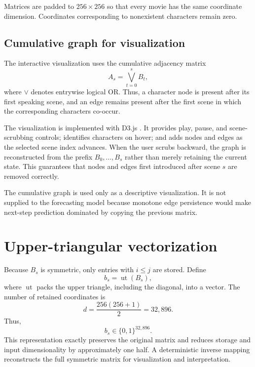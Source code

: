 \documentclass[11pt]{article}
\begin{document}
Matrices are padded to $256\times256$ so that every movie has the same coordinate dimension. Coordinates corresponding to nonexistent characters remain zero.

\subsection{Cumulative graph for visualization}

The interactive visualization uses the cumulative adjacency matrix
\begin{equation}
  A_s=\bigvee_{t=0}^{s} B_t,
  \label{eq:cumulative-adjacency}
\end{equation}
where $\vee$ denotes entrywise logical OR. Thus, a character node is present after its first speaking scene, and an edge remains present after the first scene in which the corresponding characters co-occur.

The visualization is implemented with D3.js \cite{bostock2011d3}. It provides play, pause, and scene-scrubbing controls; identifies characters on hover; and adds nodes and edges as the selected scene index advances. When the user scrubs backward, the graph is reconstructed from the prefix $B_0,\ldots,B_s$ rather than merely retaining the current state. This guarantees that nodes and edges first introduced after scene $s$ are removed correctly.

The cumulative graph is used only as a descriptive visualization. It is not supplied to the forecasting model because monotone edge persistence would make next-step prediction dominated by copying the previous matrix.

\section{Upper-triangular vectorization}

Because $B_s$ is symmetric, only entries with $i\leq j$ are stored. Define
\[
  b_s=\operatorname{ut}(B_s),
\]
where $\operatorname{ut}$ packs the upper triangle, including the diagonal, into a vector. The number of retained coordinates is
\begin{equation}
  d=\frac{256(256+1)}{2}=32{,}896.
\end{equation}
Thus,
\[
  b_s\in\{0,1\}^{32{,}896}.
\]
This representation exactly preserves the original matrix and reduces storage and input dimensionality by approximately one half. A deterministic inverse mapping reconstructs the full symmetric matrix for visualization and interpretation.
\end{document}
